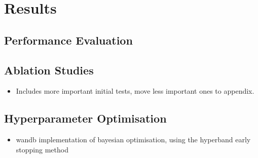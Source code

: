 \chapter{Results}

\section{Performance Evaluation}

\section{Ablation Studies}

\begin{itemize}
    \item Includes more important initial tests, move less important ones to appendix.
\end{itemize}

\section{Hyperparameter Optimisation}

{\color{red}
  \begin{itemize}
    \item wandb \cite{wandb} implementation of bayesian optimisation, using the hyperband early stopping method
  \end{itemize}
}
